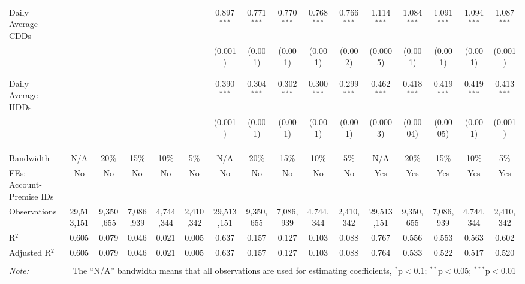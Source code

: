 \begin{table}[!htbp]
\begin{adjustbox}{scale = 0.8}
\begin{tabular}{@{\extracolsep{-7pt}}lccccccccccccccc}
 Daily Average CDDs &  &  &  &  &  & 0.897$^{***}$ & 0.771$^{***}$ & 0.770$^{***}$ & 0.768$^{***}$ & 0.766$^{***}$ & 1.114$^{***}$ & 1.084$^{***}$ & 1.091$^{***}$ & 1.094$^{***}$ & 1.087$^{***}$ \\ 
  &  &  &  &  &  & (0.001) & (0.001) & (0.001) & (0.001) & (0.002) & (0.0005) & (0.001) & (0.001) & (0.001) & (0.001) \\ 
  & & & & & & & & & & & & & & & \\ 
  & & & & & & & & & & & & & & & \\ 
 Daily Average HDDs &  &  &  &  &  & 0.390$^{***}$ & 0.304$^{***}$ & 0.302$^{***}$ & 0.300$^{***}$ & 0.299$^{***}$ & 0.462$^{***}$ & 0.418$^{***}$ & 0.419$^{***}$ & 0.419$^{***}$ & 0.413$^{***}$ \\ 
  &  &  &  &  &  & (0.001) & (0.001) & (0.001) & (0.001) & (0.001) & (0.0003) & (0.0004) & (0.0005) & (0.001) & (0.001) \\ 
  & & & & & & & & & & & & & & & \\ 
  & & & & & & & & & & & & & & & \\ 
\hline \\[-1.8ex] 
Bandwidth & N/A & 20\% & 15\% & 10\% & 5\% & N/A & 20\% & 15\% & 10\% & 5\% & N/A & 20\% & 15\% & 10\% & 5\% \\ 
FEs: Account-Premise IDs & No & No & No & No & No & No & No & No & No & No & Yes & Yes & Yes & Yes & Yes \\ 
Observations & 29,513,151 & 9,350,655 & 7,086,939 & 4,744,344 & 2,410,342 & 29,513,151 & 9,350,655 & 7,086,939 & 4,744,344 & 2,410,342 & 29,513,151 & 9,350,655 & 7,086,939 & 4,744,344 & 2,410,342 \\ 
R$^{2}$ & 0.605 & 0.079 & 0.046 & 0.021 & 0.005 & 0.637 & 0.157 & 0.127 & 0.103 & 0.088 & 0.767 & 0.556 & 0.553 & 0.563 & 0.602 \\ 
Adjusted R$^{2}$ & 0.605 & 0.079 & 0.046 & 0.021 & 0.005 & 0.637 & 0.157 & 0.127 & 0.103 & 0.088 & 0.764 & 0.533 & 0.522 & 0.517 & 0.520 \\ 
\hline 
\hline \\[-1.8ex] 
\textit{Note:}  & \multicolumn{15}{r}{The ``N/A'' bandwidth means that all observations are used for estimating coefficients, $^{*}$p$<$0.1; $^{**}$p$<$0.05; $^{***}$p$<$0.01} \\ 
\end{tabular}

\end{adjustbox}

\end{table} 
